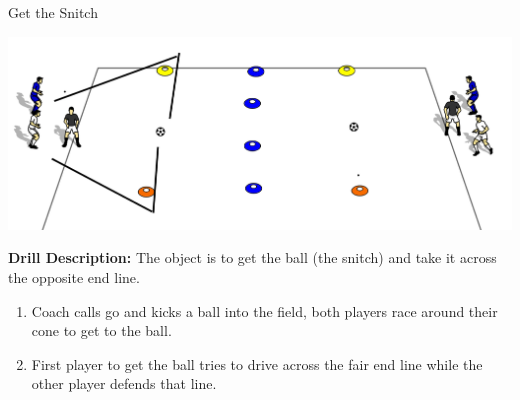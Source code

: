 \begin{evenBlock}{Get the Snitch}

\begin{minipage}[t]{\linewidth}
    \centering
    
    \begin{minipage}{.5\linewidth} %
        \includegraphics[width=\textwidth]{../img/Trimmed/Get_the_Snitch}
    \end{minipage}
    \hspace{0.05\linewidth}
    \begin{minipage}{.4\linewidth} %
        \textbf{Drill Description:}
        The object is to get the ball (the snitch) and take it across the opposite end line.
        \begin{enumerate}
            \setlength{\itemsep}{0pt}
            \setlength{\parskip}{0pt}
            \setlength{\parsep}{0pt}
            \item Coach calls go and kicks a ball into the field, both players race around their cone to get to the ball.
            \item First player to get the ball tries to drive across the fair end line while the other player defends that line.
        \end{enumerate}
    \end{minipage}
\end{minipage}
\vspace{12pt}

\end{evenBlock}